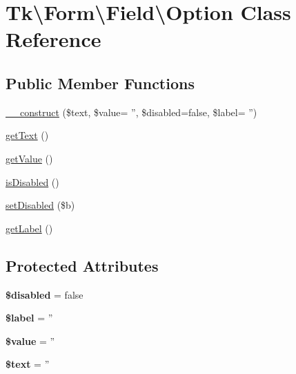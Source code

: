 \hypertarget{classTk_1_1Form_1_1Field_1_1Option}{\section{Tk\textbackslash{}Form\textbackslash{}Field\textbackslash{}Option Class Reference}
\label{classTk_1_1Form_1_1Field_1_1Option}
}
\subsection*{Public Member Functions}
\begin{DoxyCompactItemize}
\item 
\hyperlink{classTk_1_1Form_1_1Field_1_1Option_acbebbc2bfa814af0985db52ce44470b7}{\+\_\+\+\_\+construct} (\$text, \$value= '', \$disabled=false, \$label= '')
\item 
\hyperlink{classTk_1_1Form_1_1Field_1_1Option_a0be52c2e07e5cd1b43a03df0ee890256}{get\+Text} ()
\item 
\hyperlink{classTk_1_1Form_1_1Field_1_1Option_ad893e40465a91f7a49110673bf81244d}{get\+Value} ()
\item 
\hyperlink{classTk_1_1Form_1_1Field_1_1Option_a1a5be9dba102c8ecf6f72bd56d094d53}{is\+Disabled} ()
\item 
\hyperlink{classTk_1_1Form_1_1Field_1_1Option_a294d62346b5f126a8a991a8fcbed59ce}{set\+Disabled} (\$b)
\item 
\hyperlink{classTk_1_1Form_1_1Field_1_1Option_a6c7c07999e2a7f98b63b4069be322c6d}{get\+Label} ()
\end{DoxyCompactItemize}
\subsection*{Protected Attributes}
\begin{DoxyCompactItemize}
\item 
\hypertarget{classTk_1_1Form_1_1Field_1_1Option_af9706a334953ea64c0ba5953ebb9acb5}{{\bfseries \$disabled} = false}\label{classTk_1_1Form_1_1Field_1_1Option_af9706a334953ea64c0ba5953ebb9acb5}

\item 
\hypertarget{classTk_1_1Form_1_1Field_1_1Option_a5e0262dfe6e83fbbb187d5297d7fbbcc}{{\bfseries \$label} = ''}\label{classTk_1_1Form_1_1Field_1_1Option_a5e0262dfe6e83fbbb187d5297d7fbbcc}

\item 
\hypertarget{classTk_1_1Form_1_1Field_1_1Option_a08762e53df8da324579e1b27a279e3b5}{{\bfseries \$value} = ''}\label{classTk_1_1Form_1_1Field_1_1Option_a08762e53df8da324579e1b27a279e3b5}

\item 
\hypertarget{classTk_1_1Form_1_1Field_1_1Option_a730902b434a7ddb80c7e06ddfcb8815d}{{\bfseries \$text} = ''}\label{classTk_1_1Form_1_1Field_1_1Option_a730902b434a7ddb80c7e06ddfcb8815d}

\end{DoxyCompactItemize}


